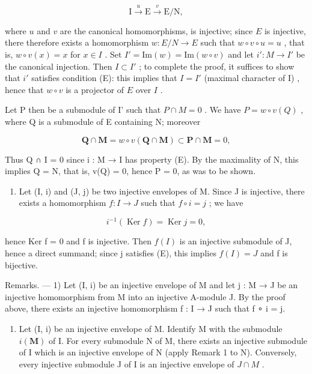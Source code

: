 \[
\mathrm{I} \xrightarrow {u} \mathrm{E} \xrightarrow {v} \mathrm{E} / \mathrm{N},
\]

where \(u\) and \(v\) are the canonical homomorphisms, is injective; since \(E\) is injective, there therefore exists a homomorphism \(w: E/N \to E\) such that \(w \circ v \circ u = u\) , that is, \(w \circ v(x) = x\) for \(x \in I\) . Set \(I' = \text{Im}(w) = \text{Im}(w \circ v)\) and let \(i': M \to I'\) be the canonical injection. Then \(I \subset I'\) ; to complete the proof, it suffices to show that \(i'\) satisfies condition (E): this implies that \(I = I'\) (maximal character of I) , hence that \(w \circ v\) is a projector of \(E\) over \(I\) .

Let P then be a submodule of I' such that \(P \cap M = 0\) . We have \(P = w \circ v(Q)\) , where Q is a submodule of E containing N; moreover

\[
\mathbf {Q} \cap \mathbf {M} = w \circ v (\mathbf {Q} \cap \mathbf {M}) \subset \mathbf {P} \cap \mathbf {M} = 0,
\]

Thus Q ∩ I = 0 since i : M → I has property (E). By the maximality of N, this implies Q = N, that is, v(Q) = 0, hence P = 0, as was to be shown.

\begin{enumerate}
\def\labelenumi{\alph{enumi})}
\setcounter{enumi}{1}
\tightlist
\item
  Let (I, i) and (J, j) be two injective envelopes of M. Since J is injective, there exists a homomorphism \(f: I \to J\) such that \(f \circ i = j\) ; we have
\end{enumerate}

\[
i ^ {- 1} (\operatorname{Ker} f) = \operatorname{Ker} j = 0,
\]

hence Ker f = 0 and f is injective. Then \(f(I)\) is an injective submodule of J, hence a direct summand; since j satisfies (E), this implies \(f(I) = J\) and f is bijective.

Remarks. --- 1) Let (I, i) be an injective envelope of M and let j : M → J be an injective homomorphism from M into an injective A-module J. By the proof above, there exists an injective homomorphism f : I → J such that f ∘ i = j.

\begin{enumerate}
\def\labelenumi{\arabic{enumi})}
\setcounter{enumi}{1}
\tightlist
\item
  Let (I, i) be an injective envelope of M. Identify M with the submodule \(i(\mathbf{M})\) of I. For every submodule N of M, there exists an injective submodule of I which is an injective envelope of N (apply Remark 1 to N). Conversely, every injective submodule J of I is an injective envelope of \(J \cap M\) .
\end{enumerate}

